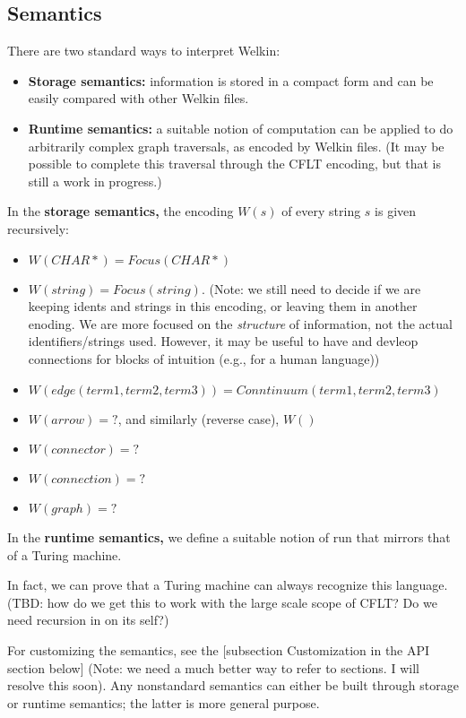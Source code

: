 \subsection{Semantics}
There are two standard ways to interpret Welkin:
\begin{itemize}
	\item \textbf{Storage semantics:} information is stored in a compact form and can be easily compared with other Welkin files.
	\item \textbf{Runtime semantics:} a suitable notion of computation can be applied to do arbitrarily complex graph traversals, as encoded by Welkin files. (It may be possible to complete this traversal through the CFLT encoding, but that is still a work in progress.)
\end{itemize}
In the \textbf{storage semantics,} the encoding $W(s)$ of every string $s$ is given recursively:
\begin{itemize}
	\item $W(CHAR*) = Focus(CHAR*)$
	\item $W(string) = Focus(string)$. (Note: we still need to decide if we are keeping idents and strings in this encoding, or leaving them in another enoding. We are more focused on the \textit{structure} of information, not the actual identifiers/strings used. However, it may be useful to have and devleop connections for blocks of intuition (e.g., for a human language))
	\item $W(edge(term1, term2, term3)) = Conntinuum(term1, term2, term3)$
	\item $W(arrow) = ? $, and similarly (reverse case), $W()$
	\item $W(connector) = ?$
	\item $W(connection) = ?$
  \item $W(graph) = ?$
\end{itemize}
In the \textbf{runtime semantics,} we define a suitable notion of run that mirrors that of a Turing machine.

In fact, we can prove that a Turing machine can always recognize this language. (TBD: how do we get this to work with the large scale scope of CFLT? Do we need recursion in on its self?)

For customizing the semantics, see the [subsection Customization in the API section below] (Note: we need a much better way to refer to sections. I will resolve this soon). Any nonstandard semantics can either be built through storage or runtime semantics; the latter is more general purpose.


